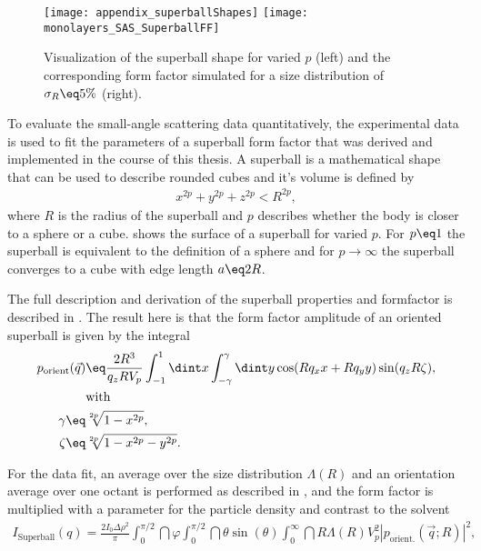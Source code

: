 \documentclass[\main/dresen_thesis.tex]{subfiles}
\begin{document}
  \label{sec:monolayers:nanoparticle:structuralCharacterization}
    \begin{figure}[tb]
      \centering
      \texttt{[image: appendix\_superballShapes]}
      \texttt{[image: monolayers\_SAS\_SuperballFF]}
      \caption{\label{fig:monolayers:nanoparticle:superballShapes}Visualization of the superball shape for varied $p$ (left) and the corresponding form factor simulated for a size distribution of $\sigma_R \eq 5 \%$ (right).}
    \end{figure}
    To evaluate the small-angle scattering data quantitatively, the experimental data is used to fit the parameters of a superball form factor that was derived and implemented in the course of this thesis.
    A superball is a mathematical shape that can be used to describe rounded cubes and it's volume is defined by
    \begin{align}
      x^{2p} + y^{2p} + z^{2p} < R^{2p},
    \end{align}
    where $R$ is the radius of the superball and $p$ describes whether the body is closer to a sphere or a cube.
     shows the surface of a superball for varied $p$.
    For $p\eq 1$ the superball is equivalent to the definition of a sphere and for $p \rightarrow \infty$ the superball converges to a cube with edge length $a \eq 2R$.

    The full description and derivation of the superball properties and formfactor is described in .
    The result here is that the form factor amplitude of an oriented superball is given by the integral
    \begin{align}
      \begin{split}
        p_\mathrm{orient}(\vec{q}) &\eq \frac{2R^3}{q_z R V_p} \int_{-1}^{1} \dint x \int_{-\gamma}^{\gamma} \dint y \cos(R q_x x + R q_y y)  \sin (q_z R \zeta),\\
        &\mathrm{with}\\
        \gamma \eq& \sqrt[2p]{1-x^{2p}}, \\
        \zeta \eq& \sqrt[2p]{1-x^{2p} -y^{2p}}.
      \end{split}
    \end{align}

    For the data fit, an average over the size distribution $\Lambda(R)$ and an orientation average over one octant is performed as described in , and the form factor is multiplied with a parameter for the particle density and contrast to the solvent
    \begin{align}
      \label{eq:superballFormfactorIntensity}
      I_\mathrm{Superball}(q) = \frac{2 I_0 \Delta \rho^2}{\pi} \int_0^{\pi/2} \dint \varphi \int_0^{\pi/2} \dint \theta \sin (\theta)  \int_0^\infty \dint R \Lambda(R) V_p^2 |p_\mathrm{orient.}(\vec{q}; R)|^2,
    \end{align}
\end{document}
